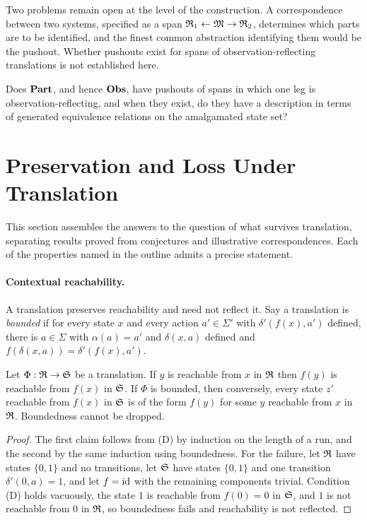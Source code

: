 Two problems remain open at the level of the construction. A correspondence between two systems, specified as a span $\mathfrak R_1\leftarrow\mathfrak M\to\mathfrak R_2$, determines which parts are to be identified, and the finest common abstraction identifying them would be the pushout. Whether pushouts exist for spans of observation-reflecting translations is not established here.

\begin{question}\label{q:pushout}
Does $\mathbf{Part}$, and hence $\mathbf{Obs}$, have pushouts of spans in which one leg is observation-reflecting, and when they exist, do they have a description in terms of generated equivalence relations on the amalgamated state set?
\end{question}

\section{Preservation and Loss Under Translation}

This section assembles the answers to the question of what survives translation, separating results proved from conjectures and illustrative correspondences. Each of the properties named in the outline admits a precise statement.

\paragraph{Contextual reachability.} A translation preserves reachability and need not reflect it. Say a translation is \emph{bounded} if for every state $x$ and every action $a'\in\Sigma'$ with $\delta'(f(x),a')$ defined, there is $a\in\Sigma$ with $\alpha(a)=a'$ and $\delta(x,a)$ defined and $f(\delta(x,a))=\delta'(f(x),a')$.

\begin{proposition}\label{prop:reach}
Let $\Phi:\mathfrak R\to\mathfrak S$ be a translation. If $y$ is reachable from $x$ in $\mathfrak R$ then $f(y)$ is reachable from $f(x)$ in $\mathfrak S$. If $\Phi$ is bounded, then conversely, every state $z'$ reachable from $f(x)$ in $\mathfrak S$ is of the form $f(y)$ for some $y$ reachable from $x$ in $\mathfrak R$. Boundedness cannot be dropped.
\end{proposition}
\begin{proof}
The first claim follows from (D) by induction on the length of a run, and the second by the same induction using boundedness. For the failure, let $\mathfrak R$ have states $\{0,1\}$ and no transitions, let $\mathfrak S$ have states $\{0,1\}$ and one transition $\delta'(0,a)=1$, and let $f=\mathrm{id}$ with the remaining components trivial. Condition (D) holds vacuously, the state $1$ is reachable from $f(0)=0$ in $\mathfrak S$, and $1$ is not reachable from $0$ in $\mathfrak R$, so boundedness fails and reachability is not reflected.
\end{proof}


